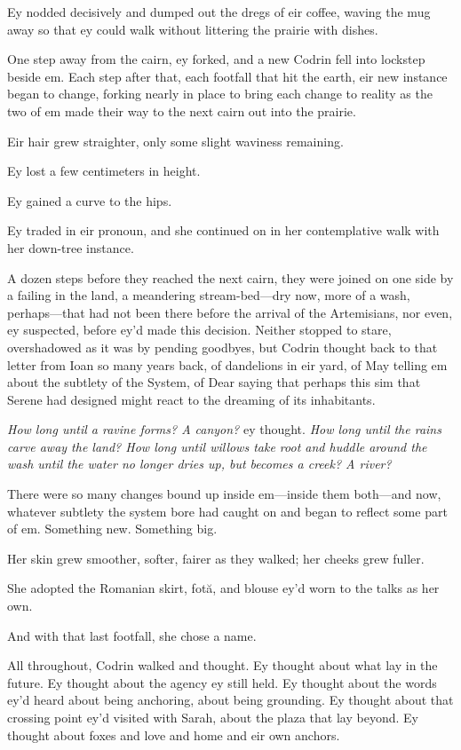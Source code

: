 Ey nodded decisively and dumped out the dregs of eir coffee, waving the mug away so that ey could walk without littering the prairie with dishes.

One step away from the cairn, ey forked, and a new Codrin fell into lockstep beside em. Each step after that, each footfall that hit the earth, eir new instance began to change, forking nearly in place to bring each change to reality as the two of em made their way to the next cairn out into the prairie.

Eir hair grew straighter, only some slight waviness remaining.

Ey lost a few centimeters in height.

Ey gained a curve to the hips.

Ey traded in eir pronoun, and she continued on in her contemplative walk with her down-tree instance.

A dozen steps before they reached the next cairn, they were joined on one side by a failing in the land, a meandering stream-bed—dry now, more of a wash, perhaps—that had not been there before the arrival of the Artemisians, nor even, ey suspected, before ey'd made this decision. Neither stopped to stare, overshadowed as it was by pending goodbyes, but Codrin thought back to that letter from Ioan so many years back, of dandelions in eir yard, of May telling em about the subtlety of the System, of Dear saying that perhaps this sim that Serene had designed might react to the dreaming of its inhabitants.

\emph{How long until a ravine forms? A canyon?} ey thought. \emph{How long until the rains carve away the land? How long until willows take root and huddle around the wash until the water no longer dries up, but becomes a creek? A river?}

There were so many changes bound up inside em—inside them both—and now, whatever subtlety the system bore had caught on and began to reflect some part of em. Something new. Something big.

Her skin grew smoother, softer, fairer as they walked; her cheeks grew fuller.

She adopted the Romanian skirt, fotă, and blouse ey'd worn to the talks as her own.

And with that last footfall, she chose a name.

All throughout, Codrin walked and thought. Ey thought about what lay in the future. Ey thought about the agency ey still held. Ey thought about the words ey'd heard about being anchoring, about being grounding. Ey thought about that crossing point ey'd visited with Sarah, about the plaza that lay beyond. Ey thought about foxes and love and home and eir own anchors.

